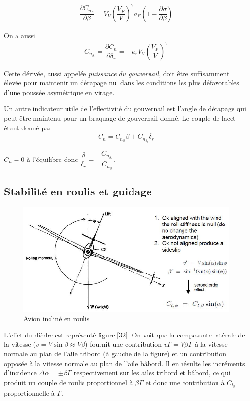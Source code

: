 \documentclass{report}
\begin{document}
\begin{eqnarray}
\dfrac{\partial C_{n_F}}{\partial \beta}=V_V\left(\dfrac{V_F}{V}\right)^2a_F\left(1-\dfrac{\partial\sigma}{\partial\beta}\right)
\end{eqnarray}

On a aussi
\begin{eqnarray}
C_{n_{\delta_r}}=\dfrac{\partial C_n}{\partial \delta_r} = -a_r V_V\left(\dfrac{V_F}{V}\right)^2
\end{eqnarray}

Cette dérivée, aussi appelée \textit{puissance du gouvernail}, doit être suffisamment élevée pour maintenir un dérapage nul dans les conditions les plus défavorables d'une poussée asymétrique en virage.

Un autre indicateur utile de l’effectivité du gouvernail est l’angle de dérapage qui peut être maintenu pour un braquage de gouvernail donné. Le couple de lacet étant donné par
\begin{eqnarray}
C_n=C_{n_\beta}\beta+C_{n_{\delta_r}}\delta_r
\end{eqnarray}

$C_n=0$ à l'équilibre donc $\dfrac{\beta}{\delta_r}=-\dfrac{C_{n_{\delta_r}}}{C_{n_{\beta}}}$.

\subsection{Stabilité en roulis et guidage}

\begin{figure}[h!]
    \centering
    \includegraphics[scale=0.7]{31.JPG}
    \caption{Avion incliné en roulis}
    \label{31}
\end{figure}

L'effet du dièdre est représenté figure \ref{32}. On voit que la composante latérale de la vitesse ($v=V\sin\beta\approx V\beta$) fournit une contribution $v\Gamma = V\beta \Gamma$ à la vitesse normale au plan de l'aile tribord (à gauche de la figure) et un contribution opposée à la vitesse normale au plan de l'aile bâbord. Il en résulte les incréments d'incidence $\Delta\alpha=\pm \beta\Gamma$ respectivement sur les ailes tribord et bâbord, ce qui produit un couple de roulis proportionnel à $\beta\Gamma$ et donc une contribution à $C_{l_\beta}$ proportionnelle à $\Gamma$.
\end{document}
